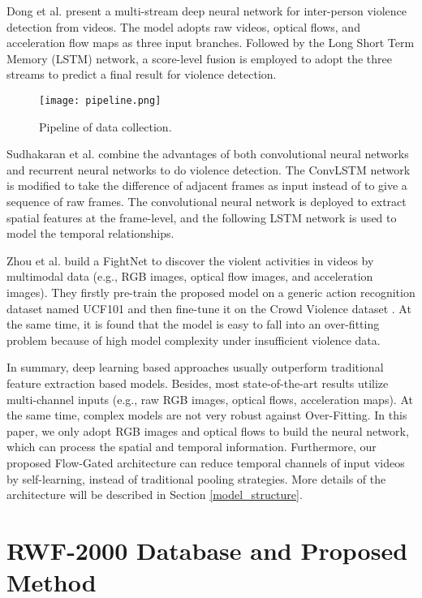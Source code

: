 \documentclass[a4paper,conference]{IEEEtran}
\begin{document}
Dong et al. \cite{d6} present a multi-stream deep neural network for inter-person violence detection from videos. The model adopts raw videos, optical flows, and acceleration flow maps as three input branches. Followed by the Long Short Term Memory (LSTM) network, a score-level fusion is employed to adopt the three streams to predict a final result for violence detection.


\begin{figure}[t]
  \centering
  \texttt{[image: pipeline.png]}
  \caption{Pipeline of data collection.}
  \label{pipline}
\end{figure}


Sudhakaran et al. \cite{convlstm-violence} combine the advantages of both convolutional neural networks and recurrent neural networks to do violence detection. The ConvLSTM network \cite{d8} is modified to take the difference of adjacent frames as input instead of to give a sequence of raw frames. The convolutional neural network is deployed to extract spatial features at the frame-level, and the following LSTM network is used to model the temporal relationships.  

Zhou et al. \cite{zhou2017violent} build a FightNet to discover the violent activities in videos by multimodal data (e.g., RGB images, optical flow images, and acceleration images). They firstly pre-train the proposed model on a generic action recognition dataset named UCF101 \cite{d7} and then fine-tune it on the Crowd Violence dataset \cite{r3}. At the same time, it is found that the model is easy to fall into an over-fitting problem because of high model complexity under insufficient violence data.

In summary, deep learning based approaches usually outperform traditional feature extraction based models. Besides, most state-of-the-art results utilize multi-channel inputs (e.g., raw RGB images, optical flows, acceleration maps). At the same time, complex models are not very robust against Over-Fitting. In this paper, we only adopt RGB images and optical flows to build the neural network, which can process the spatial and temporal information. Furthermore, our proposed Flow-Gated architecture can reduce temporal channels of input videos by self-learning, instead of traditional pooling strategies. More details of the architecture will be described in Section \ref{model_structure}.


\section{RWF-2000 Database and Proposed Method}
\end{document}
